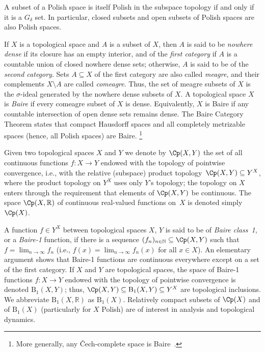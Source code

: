 \begin{fact}\cite[4.3.24]{Engelking:1989}
A subset of a Polish space is itself Polish in the subspace topology if and only if it is a $G_{\delta }$ set.
In particular, closed subsets and open subsets of Polish spaces are also Polish spaces.
\end{fact}

If $X$ is a topological space and $A$ is a subset of $X$, then $A$ is said to be
\emph{nowhere dense} if its closure has an empty interior,
and of the \emph{first category} if $A$ is a countable union of closed nowhere dense sets;
otherwise, $A$ is said to be of the \emph{second category}.
Sets $A\subseteq X$ of the first category are also called \emph{meagre}, and their
complements $X\setminus A$ are called \emph{comeagre}.
Thus, the set of meagre subsets of $X$ is the $\sigma$-ideal generated by the nowhere dense subsets of $X$.
A topological space $X$ is \emph{Baire} if every comeagre subset of $X$ is dense.
Equivalently, $X$ is Baire if any countable intersection of open dense sets remains dense.
The Baire Category Theorem states that compact Hausdorff spaces and all completely metrizable spaces (hence, all Polish spaces) are Baire.%
\footnote{More generally, any Čech-complete space is Baire~\cite[Theorem 3.9.3]{Engelking:1989}.}

Given two topological spaces $X$ and $Y$ we denote by $\Cp(X,Y)$ the set of all continuous functions $f\colon X\rightarrow Y$ endowed with the topology of pointwise convergence, i.e., with the relative (subspace) product topology~$\Cp(X,Y)\subseteq Y^X$, where the product topology on $Y^X$ uses only $Y$'s topology; the topology on $X$ enters through the requirement that elements of $\Cp(X,Y)$ be continuous.
The space $\Cp(X, \mathbb{R})$ of continuous real-valued functions on~$X$ is denoted simply~$\Cp(X)$.

A function $f\in Y^X$ between topological spaces $X$, $Y$ is said to be of \emph{Baire class~1}, or a \emph{Baire-1} function, if there is a sequence $(f_n)_{n\in \mathbb{N}}\subseteq \Cp(X, Y)$ such that $f = \lim_{n\to\infty}f_n$ (i.e., $f(x)=\lim_{n\to\infty}f_n(x)$ for all $x\in X$).
An elementary argument shows that Baire-1 functions are continuous everywhere except on a set of the first category.
If $X$ and $Y$ are topological spaces, the space of Baire-1 functions $f\colon X\rightarrow Y$ endowed with the topology of pointwise convergence is denoted $\mathrm{B}_1(X,Y)$;
thus, $\Cp(X,Y)\subseteq \mathrm{B}_1(X,Y)\subseteq Y^X$ are topological inclusions.
We abbreviate $\mathrm{B}_1(X, \mathbb{R})$ as $\mathrm{B}_1(X)$.
Relatively compact subsets of $\Cp(X)$ and of $\mathrm{B}_1(X)$ (particularly for $X$ Polish) are of interest in analysis and topological dynamics.

